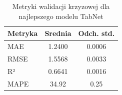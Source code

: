 \begin{table}[h]
\centering
\caption{Metryki walidacji krzyzowej dla najlepszego modelu TabNet}
\label{tab:cv_metrics_tabnet}
\begin{tabular}{lcc}
\toprule
Metryka & Srednia & Odch. std. \\
\midrule
MAE & 1.2400 & 0.0006 \\
RMSE & 1.5568 & 0.0033 \\
R² & 0.6641 & 0.0016 \\
MAPE & 34.92 & 0.25 \\
\bottomrule
\end{tabular}
\end{table}
